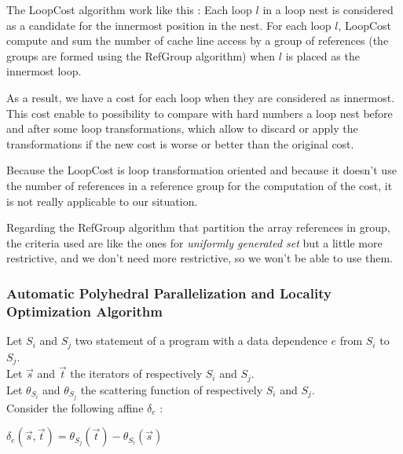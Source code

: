 \documentclass[paper=a4, fontsize=11.5pt]{scrartcl}
\numberwithin{equation}{section}        %
\numberwithin{figure}{section}          %
\numberwithin{table}{section}               %
\begin{document}
            The LoopCost algorithm work like this : 
            Each loop $l$ in a loop nest is considered as a candidate for the innermost
            position in the nest. For each loop $l$, LoopCost compute and sum the number
            of cache line access by a group of references (the groups are formed
            using the RefGroup algorithm) when $l$ is placed as the innermost loop.

            As a result, we have a cost for each loop when they are considered as innermost.
            This cost enable to possibility to compare with hard numbers
            a loop nest before and after some loop transformations, which allow to discard
            or apply the transformations if the new cost is worse or better than the
            original cost.
            \bigskip

            Because the LoopCost is loop transformation oriented and because it doesn't
            use the number of references in a reference group for the computation
            of the cost, it is not really applicable to our situation.

            Regarding the RefGroup algorithm that partition the array references
            in group, the criteria used are like the ones for \textit{uniformly generated set}
            but a little more restrictive, and we don't need more restrictive, so we won't
            be able to use them.
            
            
        \subsubsection{Automatic Polyhedral Parallelization and Locality Optimization Algorithm}
        \label{sec:auto_poly_paral}
            Let $S_i$ and $S_j$ two statement of a program with a data dependence $e$
            from $S_i$ to $S_j$.\\
            Let $\vec{s}$ and $\vec{t}$ the iterators of respectively $S_i$ and $S_j$.\\
            Let $\theta_{S_i}$ and $\theta_{S_j}$ the scattering function of respectively $S_i$
            and $S_j$.\\
            Consider the following affine $\delta_e$ :
            \begin{center}
                $\delta_e\left(\vec{s},\vec{t}\right) = \theta_{S_j}\left(\vec{t}\right) - \theta_{S_i}\left(\vec{s}\right)$
            \end{center}
\end{document}
